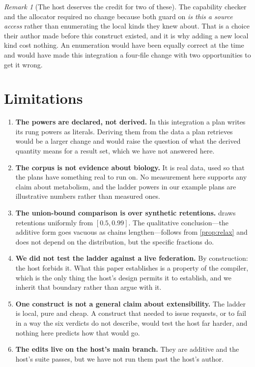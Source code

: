 \documentclass[11pt,twocolumn,a4paper]{article}
\theoremstyle{plain}
\theoremstyle{definition}
\theoremstyle{remark}
\newtheorem{remark}[theorem]{Remark}
\begin{document}
\begin{remark}[The host deserves the credit for two of these]
\label{rem:credit}
The capability checker and the allocator required no change because both guard
on \emph{is this a source access} rather than enumerating the local kinds they
knew about. That is a choice their author made before this construct existed,
and it is why adding a new local kind cost nothing. An enumeration would have
been equally correct at the time and would have made this integration a
four-file change with two opportunities to get it wrong.
\end{remark}

\section{Limitations}
\label{sec:limitations}

\begin{enumerate}[leftmargin=2em,itemsep=0.4em]

\item \textbf{The powers are declared, not derived.} In this integration a
plan writes its rung powers as literals. Deriving them from the data a plan
retrieves would be a larger change and would raise the question of what the
derived quantity means for a result set, which we have not answered here.

\item \textbf{The corpus is not evidence about biology.} It is real data, used
so that the plans have something real to run on. No measurement here supports
any claim about metabolism, and the ladder powers in our example plans are
illustrative numbers rather than measured ones.

\item \textbf{The union-bound comparison is over synthetic retentions.}
 draws retentions uniformly from $[0.5,0.99]$. The
qualitative conclusion---the additive form goes vacuous as chains
lengthen---follows from \cref{prop:relax} and does not depend on the
distribution, but the specific fractions do.

\item \textbf{We did not test the ladder against a live federation.} By
construction: the host forbids it. What this paper establishes is a property
of the compiler, which is the only thing the host's design permits it to
establish, and we inherit that boundary rather than argue with it.

\item \textbf{One construct is not a general claim about extensibility.} The
ladder is local, pure and cheap. A construct that needed to issue requests, or
to fail in a way the six verdicts do not describe, would test the host far
harder, and nothing here predicts how that would go.

\item \textbf{The edits live on the host's main branch.} They are additive and
the host's suite passes, but we have not run them past the host's author.

\end{enumerate}
\end{document}
